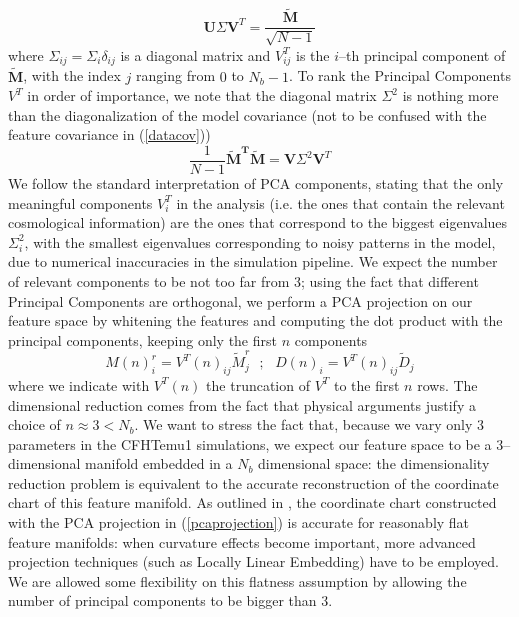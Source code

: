 \documentclass[reprint,aps,prd,superscriptaddress,showkeys,showpacs]{revtex4-1}
\begin{document}
\begin{equation}
\label{svd}
\mathbf{U}\Sigma \mathbf{V}^T=\frac{\mathbf{\tilde{M}}}{\sqrt{N-1}}
\end{equation}   
%
where $\Sigma_{ij}=\Sigma_i\delta_{ij}$ is a diagonal matrix and $V^T_{ij}$ is the $i$--th principal component of $\mathbf{\tilde{M}}$, with the index $j$ ranging from $0$ to $N_b-1$. To rank the Principal Components $V^T$ in order of importance, we note that the diagonal matrix $\Sigma^2$ is nothing more than the diagonalization of the model covariance (not to be confused with the feature covariance in (\ref{datacov}))
\begin{equation}
\frac{1}{N-1}\mathbf{\tilde{M}^T\tilde{M}} = \mathbf{V}\Sigma^2\mathbf{V}^T
\end{equation} 
%
We follow the standard interpretation of PCA components, stating that the only meaningful components $V^T_i$ in the analysis (i.e. the ones that contain the relevant cosmological information) are the ones that correspond to the biggest eigenvalues $\Sigma^2_{i}$, with the smallest eigenvalues corresponding to noisy patterns in the model, due to numerical inaccuracies in the simulation pipeline. We expect the number of relevant components to be not too far from 3; using the fact that different Principal Components are orthogonal, we perform a PCA projection on our feature space by whitening the features and computing the dot product with the principal components, keeping only the first $n$ components
\begin{equation}
\label{pcaprojection}
M(n)_{i}^r = V^T(n)_{ij}\tilde{M}_j^r \,\,\,\, ; \,\,\,\,  D(n)_i = V^T(n)_{ij}\tilde{D}_j
\end{equation}
%
where we indicate with $V^T(n)$ the truncation of $V^T$ to the first $n$ rows. The dimensional reduction comes from the fact that physical arguments justify a choice of $n\approx 3< N_{b}$. We want to stress the fact that, because we vary only 3 parameters in the CFHTemu1 simulations, we expect our feature space to be a 3--dimensional manifold embedded in a $N_b$ dimensional space: the dimensionality reduction problem is equivalent to the accurate reconstruction of the coordinate chart of this feature manifold. As outlined in \citep{astroMLText}, the coordinate chart constructed with the PCA projection in (\ref{pcaprojection}) is accurate for reasonably flat feature manifolds: when curvature effects become important, more advanced projection techniques (such as Locally Linear Embedding) have to be employed. We are allowed some flexibility on this flatness assumption by allowing the number of principal components to be bigger than 3. 
\end{document}
